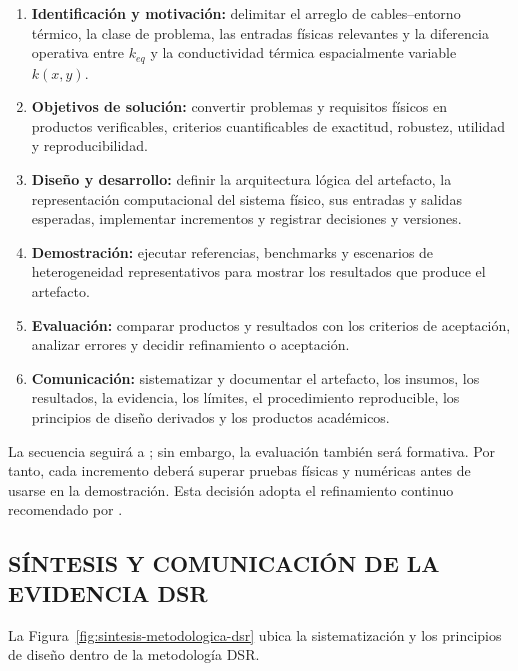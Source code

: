 \documentclass[11pt,a4paper,oneside]{report}
\newcommand{\kx}{k(x,y)}
\begin{document}
\begin{procedure}[htbp]
\caption{Proceso DSR adaptado al estudio. Fuente: Elaboración propia.}
\label{proc:dsr}
\begin{enumerate}[label=\textbf{A\arabic*.}]
  \item \textbf{Identificación y motivación:} delimitar el arreglo de cables--entorno térmico, la clase de problema, las entradas físicas relevantes y la diferencia operativa entre $k_{eq}$ y la conductividad térmica espacialmente variable $\kx$.
  \item \textbf{Objetivos de solución:} convertir problemas y requisitos físicos en productos verificables, criterios cuantificables de exactitud, robustez, utilidad y reproducibilidad.
  \item \textbf{Diseño y desarrollo:} definir la arquitectura lógica del artefacto, la representación computacional del sistema físico, sus entradas y salidas esperadas, implementar incrementos y registrar decisiones y versiones.
  \item \textbf{Demostración:} ejecutar referencias, benchmarks y escenarios de heterogeneidad representativos para mostrar los resultados que produce el artefacto.
  \item \textbf{Evaluación:} comparar productos y resultados con los criterios de aceptación, analizar errores y decidir refinamiento o aceptación.
  \item \textbf{Comunicación:} sistematizar y documentar el artefacto, los insumos, los resultados, la evidencia, los límites, el procedimiento reproducible, los principios de diseño derivados y los productos académicos.
\end{enumerate}
\end{procedure}

La secuencia seguirá a \textcite[55--56]{peffers2007}; sin embargo, la evaluación también será formativa. Por tanto, cada incremento deberá superar pruebas físicas y numéricas antes de usarse en la demostración. Esta decisión adopta el refinamiento continuo recomendado por \textcite[198--203]{delport2024}.

\subsection{SÍNTESIS Y COMUNICACIÓN DE LA EVIDENCIA DSR}
\label{subsec:sintesis-dsr}

La Figura~\ref{fig:sintesis-metodologica-dsr} ubica la sistematización y los principios de diseño dentro de la metodología DSR.
\end{document}
